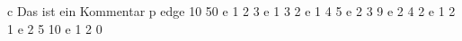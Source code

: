 c Das ist ein Kommentar
p edge 10 50
e 1 2 3
e 1 3 2
e 1 4 5
e 2 3 9 
e 2 4 2
e 1 2 1
e 2 5 10
e 1 2 0